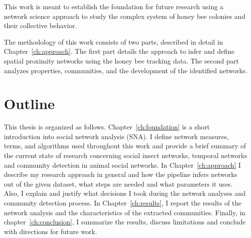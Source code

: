 This work is meant to establish the foundation for future research using a network science approach to study the complex system of honey bee colonies and their collective behavior.

The methodology of this work consists of two parts, described in detail in Chapter~\ref{ch:approach}.
The first part details the approach to infer and define spatial proximity networks using the honey bee tracking data.
The second part analyzes properties, communities, and the development of the identified networks.  

\section{Outline}
This thesis is organized as follows.
Chapter~\ref{ch:foundation} is a short introduction into social network analysis (SNA). I define network measures, terms, and algorithms used throughout this work and provide a brief summary of the current state of research concerning social insect networks, temporal networks and community detection in animal social networks.
In Chapter~\ref{ch:approach} I describe my research approach in general and how the pipeline infers networks out of the given dataset, what steps are needed and what parameters it uses.
Also, I explain and justify what decisions I took during the network analyses and community detection process.
In Chapter~\ref{ch:results}, I report the results of the network analysis and the characteristics of the extracted communities.
Finally, in chapter~\ref{ch:conclusion}, I summarize the results, discuss limitations and conclude with directions for future work.